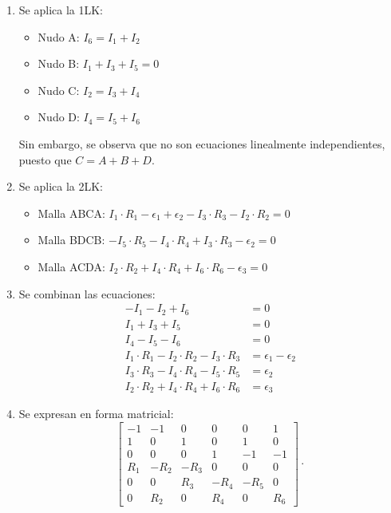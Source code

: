 \documentclass[11pt]{book} %
\begin{document}
\begin{example}
		\begin{enumerate}
			\item {Se aplica la 1LK:} 
			\begin{itemize}
				\item {Nudo A:} $I_6 = I_1 + I_2$
				\item {Nudo B:} $I_1 + I_3 + I_5 = 0$
				\item {Nudo C:} $I_2 = I_3 + I_4$
				\item {Nudo D:} $I_4 = I_5 + I_6$
			\end{itemize}
			Sin embargo, se observa que no son ecuaciones linealmente independientes, puesto que $C=A+B+D$.
			\item {Se aplica la 2LK:}
			\begin{itemize}
				\item {Malla ABCA:} $I_1 \cdot R_1 - \epsilon_1 + \epsilon_2 - I_3 \cdot R_3 - I_2 \cdot R_2 = 0$
				\item {Malla BDCB:} $-I_5 \cdot R_5 - I_4 \cdot R_4 + I_3 \cdot R_3 - \epsilon_2 = 0$
				\item {Malla ACDA:} $I_2 \cdot R_2 + I_4 \cdot R_4 + I_6 \cdot R_6 - \epsilon_3 = 0$
			\end{itemize}
			\item {Se combinan las ecuaciones:}
			\begin{align*}
				- I_1 -  I_2 + I_6  &= 0\\
				I_1 + I_3 + I_5 &= 0\\
				I_4 - I_5 - I_6 &= 0\\
				I_1 \cdot R_1 - I_2 \cdot R_2 - I_3 \cdot R_3 &= \epsilon_1 - \epsilon_2\\
				I_3 \cdot R_3 - I_4 \cdot R_4 -I_5 \cdot R_5 &= \epsilon_2\\
				I_2 \cdot R_2 + I_4 \cdot R_4 + I_6 \cdot R_6 &= \epsilon_3
			\end{align*}
			\item {Se expresan en forma matricial:}
			\begin{equation*}
				\begin{bmatrix}
					-1 & -1 & 0 & 0 & 0 & 1\\
					1 & 0 & 1 & 0 & 1 & 0\\
					0 & 0 & 0 & 1 & -1 & -1\\
					R_1 & -R_2 & - R_3 & 0 & 0 & 0\\
					0 & 0 & R_3 & - R_4 & - R_5 & 0\\
					0 & R_2 & 0 & R_4 & 0 & R_6
				\end{bmatrix} \cdot %

\end{equation*}
\end{enumerate}
\end{example}
\end{document}
